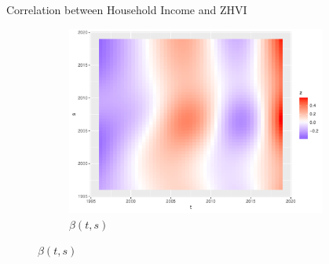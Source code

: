 \documentclass[final]{beamer}
\newlength{\sepwidth}
\newlength{\colwidth}
\newcommand{\separatorcolumn}{\begin{column}{\sepwidth}\end{column}}
\begin{document}
\begin{frame}[t]
\begin{columns}[t]
\begin{column}{\colwidth}
\begin{block}{Correlation between Household Income and ZHVI}
\begin{figure}[h]
\begin{subfigure}{0.5\textwidth}
    \includegraphics[width=1.05\linewidth]{figure/reg_beta.pdf}
    \caption{$\beta(t,s)$}
  \end{subfigure}%
\end{figure}


  \end{block}

\end{column}



\separatorcolumn
\end{columns}
\end{frame}
\end{document}
